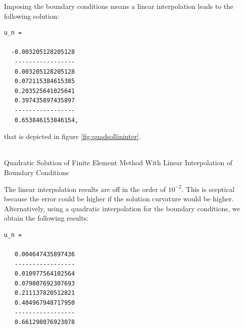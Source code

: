 \documentclass[a4paper,12pt]{article}
\makeatletter
\newenvironment{figurehere}
  {\def\@captype{figure}}
  {}
\makeatother
\begin{document}
Imposing the boundary conditions means a linear interpolation leads to the following solution:
\begin{verbatim}
u_n =

  -0.003205128205128
   -----------------
   0.003205128205128
   0.072115384615385
   0.203525641025641
   0.397435897435897
   -----------------
   0.653846153846154,
\end{verbatim}
that is depicted in figure \ref{fig:quadsollininter}.\\
\begin{center}
\begin{figurehere} 
\\
\caption{Quadratic Solution of Finite Element Method With Linear Interpolation of Boundary Conditions}\label{fig:quadsollininter}
\end{figurehere}
\end{center}
The linear interpolation results are off in the order of $10^{-2}$. This is sceptical because the error could be higher if the solution curvature would be higher.\\
Alternatively, using a quadratic interpolation for the boundary conditions, we obtain the following results:
\begin{verbatim}
u_n =

   0.004647435897436
   -----------------
   0.010977564102564
   0.079807692307693
   0.211137820512821
   0.404967948717950
   -----------------
   0.661298076923078
\end{verbatim}
\end{document}
